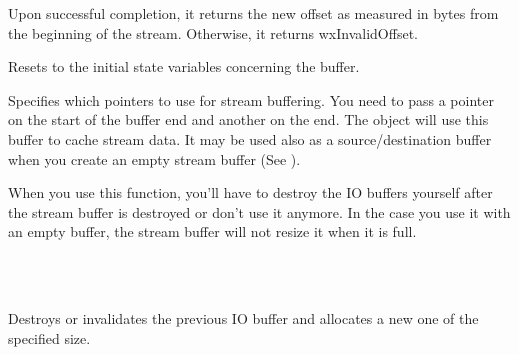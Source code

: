 \twocolwidtha{5cm}
\begin{twocollist}\itemsep=0pt
\end{twocollist}


Upon successful completion, it returns the new offset as measured in bytes from
the beginning of the stream. Otherwise, it returns wxInvalidOffset.



Resets to the initial state variables concerning the buffer.

\label{wxstreambuffersetbufferio}


Specifies which pointers to use for stream buffering. You need to pass a pointer on the
start of the buffer end and another on the end. The object will use this buffer
to cache stream data. It may be used also as a source/destination buffer when
you create an empty stream buffer (See ).


When you use this function, you'll have to destroy the IO buffers yourself
after the stream buffer is destroyed or don't use it anymore.
In the case you use it with an empty buffer, the stream buffer will not resize
it when it is full.


\\
\\


Destroys or invalidates the previous IO buffer and allocates a new one of the
specified size.


